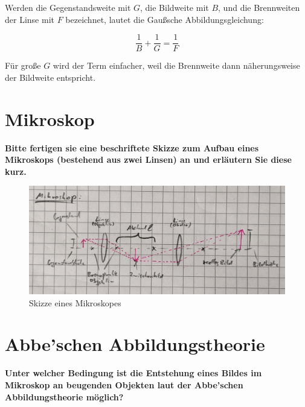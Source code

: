 \documentclass[a4paper, 12pt]{article}
\begin{document}
Werden die Gegenstandsweite mit $G$, die Bildweite mit $B$, und die Brennweiten der Linse mit $F$ bezeichnet, lautet die Gaußsche Abbildungsgleichung:

$$\frac{1}{B}+\frac{1}{G} = \frac{1}{F}$$

Für große $G$ wird der Term einfacher, weil die Brennweite dann näherungsweise der Bildweite entspricht.

\newpage
\section{Mikroskop}
\textbf{Bitte fertigen sie eine beschriftete Skizze zum Aufbau eines Mikroskops (bestehend aus zwei Linsen) an und erläutern Sie diese kurz.}

\begin{figure}[h]
\centering
	\includegraphics[width=\textwidth]{mikroskop.png}
	\caption{Skizze eines Mikroskopes}
\end{figure}

\section{Abbe’schen Abbildungstheorie}
\textbf{Unter welcher Bedingung ist die Entstehung eines Bildes im Mikroskop an beugenden Objekten laut der Abbe’schen Abbildungstheorie möglich?}
\end{document}
